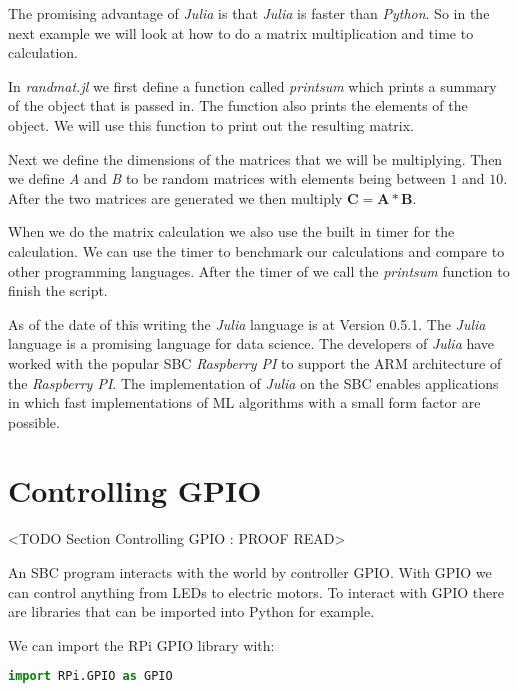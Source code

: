 	

The promising advantage of \emph{Julia} is that \emph{Julia} is faster than \emph{Python}. So in the next example we will look at how to do a matrix multiplication and time to calculation.

In \emph{randmat.jl} we first define a function called \emph{printsum} which prints a summary of the object that is passed in. The function also prints the elements of the object. We will use this function to print out the resulting matrix. 

Next we define the dimensions of the matrices that we will be multiplying. Then we define \emph{A} and \emph{B} to be random matrices with elements being between $1$ and $10$. After the two matrices are generated we then multiply $\mathbf{C}=\mathbf{A}*\mathbf{B}$. 

When we do the matrix calculation we also use the built in timer for the calculation. We can use the timer to benchmark our calculations and compare to other programming languages. After the timer of we call the \emph{printsum} function to finish the script.

	
	
As of the date of this writing the \emph{Julia} language is at Version 0.5.1. The \emph{Julia} language is a promising language for data science. The developers of \emph{Julia} have worked with the popular \ac{SBC} \emph{Raspberry PI} to support the \ac{ARM} architecture of the \emph{Raspberry PI}. The implementation of \emph{Julia} on the \ac{SBC} enables applications in which fast implementations of \ac{ML} algorithms with a small form factor are possible. 

	
\section{Controlling GPIO}
	<TODO Section Controlling GPIO : PROOF READ>

An \ac{SBC} program interacts with the world by controller \ac{GPIO}. With \ac{GPIO} we can control anything from \ac{LED}s to electric motors. To interact with \ac{GPIO} there are libraries that can be imported into Python for example. 

We can import the \ac{RPi} \ac{GPIO} library with:

\begin{lstlisting}[language=python]
    import RPi.GPIO as GPIO
\end{lstlisting}

